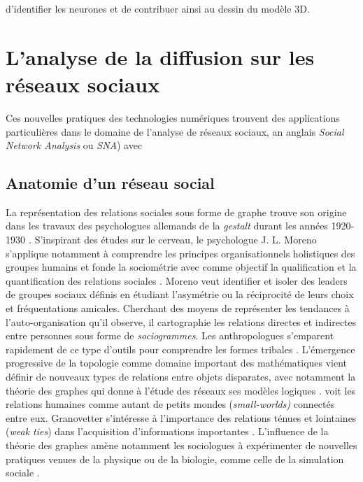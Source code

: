 d{\textquoteright}identifier les neurones et de contribuer ainsi au dessin du modèle 3D.


\section[L{\textquoteright}analyse de la diffusion sur les réseaux sociaux]{L{\textquoteright}analyse de la diffusion sur les réseaux sociaux}

Ces nouvelles pratiques des technologies numériques trouvent des applications particulières dans le domaine de l{\textquoteright}analyse de réseaux sociaux, an anglais \textit{Social Network Analysis} ou \textit{SNA}) avec 


\subsection[Anatomie d{\textquoteright}un réseau social]{ Anatomie d{\textquoteright}un réseau social}

La représentation des relations sociales sous forme de graphe trouve son origine dans les travaux des psychologues allemands de la \textit{gestalt }durant les années 1920-1930 \citep{Scott1988}\textit{. }S{\textquoteright}inspirant des études sur le cerveau, le psychologue J. L. Moreno s{\textquoteright}applique notamment à comprendre les principes organisationnels holistiques des groupes humains et fonde la sociométrie avec comme objectif la qualification et la quantification des relations sociales \citep{Moreno1938}. Moreno veut identifier et isoler des leaders de groupes sociaux définis en étudiant l{\textquoteright}asymétrie ou la réciprocité de leurs choix et fréquentations amicales. Cherchant des moyens de représenter les tendances à l{\textquoteright}auto-organisation qu{\textquoteright}il observe, il cartographie les relations directes et indirectes entre personnes sous forme de \textit{sociogrammes}. Les anthropologues s{\textquoteright}emparent rapidement de ce type d{\textquoteright}outils pour comprendre les formes tribales \citep{Lundberg1975}. L{\textquoteright}émergence progressive de la topologie comme domaine important des mathématiques vient définir de nouveaux types de relations entre objets disparates, avec notamment la théorie des graphes qui donne à l{\textquoteright}étude des réseaux ses modèles logiques \citep{Harary1977}. \cite{Travers1969} voit les relations humaines comme autant de petits mondes (\textit{small-worlds)} connectés entre eux. Granovetter s{\textquoteright}intéresse à l{\textquoteright}importance des relations ténues et lointaines (\textit{weak ties}) dans l{\textquoteright}acquisition d{\textquoteright}informations importantes \citep{Granovetter1973}. L{\textquoteright}influence de la théorie des graphes amène notamment les sociologues à expérimenter de nouvelles pratiques venues de la physique ou de la biologie, comme celle de la simulation sociale \citep{Epstein1996}. 


